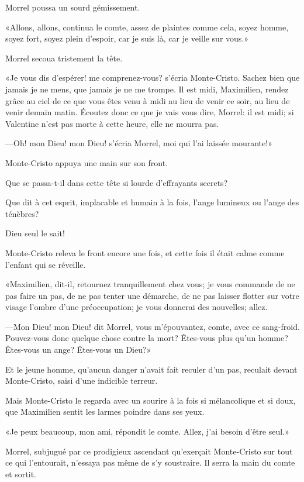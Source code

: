 Morrel poussa un sourd gémissement. 

«Allons, allons, continua le comte, assez de plaintes comme cela, soyez homme, soyez fort, soyez plein d'espoir, car je suis là, car je veille sur vous.» 

Morrel secoua tristement la tête. 

«Je vous dis d'espérer! me comprenez-vous? s'écria Monte-Cristo. Sachez bien que jamais je ne mens, que jamais je ne me trompe. Il est midi, Maximilien, rendez grâce au ciel de ce que vous êtes venu à midi au lieu de venir ce soir, au lieu de venir demain matin. Écoutez donc ce que je vais vous dire, Morrel: il est midi; si Valentine n'est pas morte à cette heure, elle ne mourra pas. 

—Oh! mon Dieu! mon Dieu! s'écria Morrel, moi qui l'ai laissée mourante!» 

Monte-Cristo appuya une main sur son front. 

Que se passa-t-il dans cette tête si lourde d'effrayants secrets? 

Que dit à cet esprit, implacable et humain à la fois, l'ange lumineux ou l'ange des ténèbres? 

Dieu seul le sait! 

Monte-Cristo releva le front encore une fois, et cette fois il était calme comme l'enfant qui se réveille. 

«Maximilien, dit-il, retournez tranquillement chez vous; je vous commande de ne pas faire un pas, de ne pas tenter une démarche, de ne pas laisser flotter sur votre visage l'ombre d'une préoccupation; je vous donnerai des nouvelles; allez. 

—Mon Dieu! mon Dieu! dit Morrel, vous m'épouvantez, comte, avec ce sang-froid. Pouvez-vous donc quelque chose contre la mort? Êtes-vous plus qu'un homme? Êtes-vous un ange? Êtes-vous un Dieu?» 

Et le jeune homme, qu'aucun danger n'avait fait reculer d'un pas, reculait devant Monte-Cristo, saisi d'une indicible terreur. 

Mais Monte-Cristo le regarda avec un sourire à la fois si mélancolique et si doux, que Maximilien sentit les larmes poindre dans ses yeux. 

«Je peux beaucoup, mon ami, répondit le comte. Allez, j'ai besoin d'être seul.» 

Morrel, subjugué par ce prodigieux ascendant qu'exerçait Monte-Cristo sur tout ce qui l'entourait, n'essaya pas même de s'y soustraire. Il serra la main du comte et sortit. 


